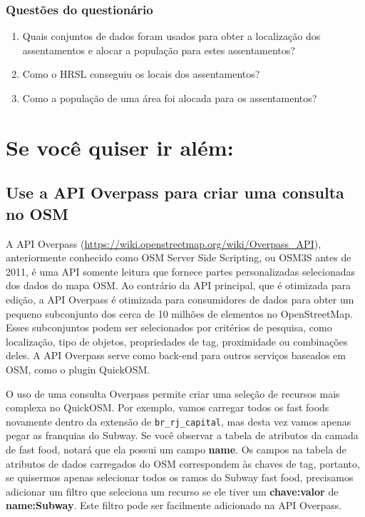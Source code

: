\documentclass[
  portuguese,
]{krantz}
\providecommand{\tightlist}{%
  \setlength{\itemsep}{0pt}\setlength{\parskip}{0pt}}
\begin{document}
\hypertarget{questuxf5es-do-questionuxe1rio}{%
\subsubsection{\texorpdfstring{\textbf{Questões do questionário}}{Questões do questionário}}\label{questuxf5es-do-questionuxe1rio}}

\begin{enumerate}
\def\labelenumi{\arabic{enumi}.}
\tightlist
\item
  Quais conjuntos de dados foram usados para obter a localização dos assentamentos e alocar a população para estes assentamentos?
\item
  Como o HRSL conseguiu os locais dos assentamentos?
\item
  Como a população de uma área foi alocada para os assentamentos?
\end{enumerate}

\hypertarget{se-vocuxea-quiser-ir-aluxe9m}{%
\section{Se você quiser ir além:}\label{se-vocuxea-quiser-ir-aluxe9m}}

\hypertarget{use-a-api-overpass-para-criar-uma-consulta-no-osm}{%
\subsection{\texorpdfstring{\textbf{Use a API Overpass para criar uma consulta no OSM}}{Use a API Overpass para criar uma consulta no OSM}}\label{use-a-api-overpass-para-criar-uma-consulta-no-osm}}

A API Overpass (\href{https:/\%20/wiki.openstreetmap.org/wiki/Overpass_API}{https://wiki.openstreetmap.org/wiki/Overpass\_API}), anteriormente conhecido como OSM Server Side Scripting, ou OSM3S antes de 2011, é uma API somente leitura que fornece partes personalizadas selecionadas dos dados do mapa OSM. Ao contrário da API principal, que é otimizada para edição, a API Overpass é otimizada para consumidores de dados para obter um pequeno subconjunto dos cerca de 10 milhões de elementos no OpenStreetMap. Esses subconjuntos podem ser selecionados por critérios de pesquisa, como localização, tipo de objetos, propriedades de tag, proximidade ou combinações deles. A API Overpass serve como back-end para outros serviços baseados em OSM, como o plugin QuickOSM.

O uso de uma consulta Overpass permite criar uma seleção de recursos mais complexa no QuickOSM. Por exemplo, vamos carregar todos os fast foods novamente dentro da extensão de \texttt{br\_rj\_capital}, mas desta vez vamos apenas pegar as franquias do Subway. Se você observar a tabela de atributos da camada de fast food, notará que ela possui um campo \textbf{name}. Os campos na tabela de atributos de dados carregados do OSM correspondem às chaves de tag, portanto, se quisermos apenas selecionar todos os ramos do Subway fast food, precisamos adicionar um filtro que seleciona um recurso se ele tiver um \textbf{chave:valor} de \textbf{name:Subway}. Este filtro pode ser facilmente adicionado na API Overpass.
\end{document}
